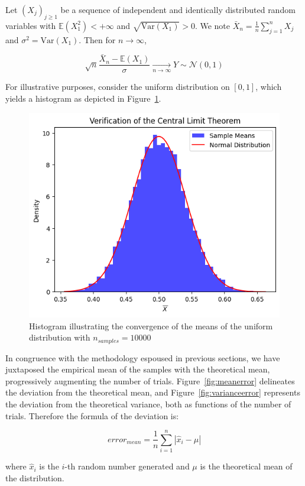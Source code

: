 \documentclass{report}
\begin{document}
\begin{theorem}
	Let $(X_j)_{j \geq 1}$ be a sequence of independent and identically distributed random variables with $\mathbb{E}(X_1^2) < + \infty$ and $\sqrt{\mathrm{Var}(X_1)} > 0$. We note $\bar{X}_n = \frac{1}{n} \sum_{j=1}^n X_j$ and $\sigma^2 = \mathrm{Var}(X_1)$. Then for $n \to \infty$,

	\begin{equation}
		\sqrt{n} \frac{\bar{X}_n - \mathbb{E}(X_1)}{\sigma} \xrightarrow[n \to \infty]{} Y \sim  \mathcal{N}(0,1)
	\end{equation}
\end{theorem}

For illustrative purposes, consider the uniform distribution on \([0,1]\), which yields a histogram as depicted in Figure~\ref{fig:verificationclt}.

\begin{figure}[H]
	\centering
	\includegraphics[width=0.5\linewidth]{./Figures/CLT/verif.png}
	\caption{Histogram illustrating the convergence of the means of the uniform distribution with $n_{samples} = 10000$}
	\label{fig:verificationclt}
\end{figure}

In congruence with the methodology espoused in previous sections, we have juxtaposed the empirical mean of the samples with the theoretical mean, progressively augmenting the number of trials. Figure~\ref{fig:meanerror} delineates the deviation from the theoretical mean, and Figure~\ref{fig:varianceerror} represents the deviation from the theoretical variance, both as functions of the number of trials. Therefore the formula of the deviation is:

\begin{equation*} error_{mean} = \frac{1}{n}\sum_{i=1}^{n} | \hat{x}_i - \mu | \end{equation*}

where \(\hat{x}_i\) is the \(i\)-th random number generated and \(\mu\) is the theoretical mean of the distribution.
\end{document}
